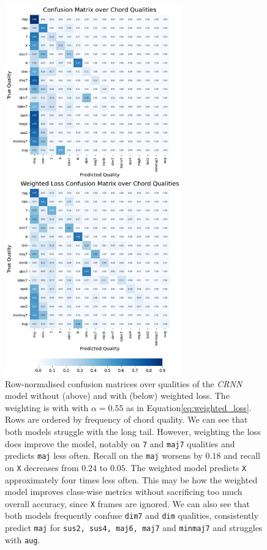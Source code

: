 \begin{figure}[H]
    \centering
    \includegraphics[width=0.68\textwidth]{figures/confusion_matrix_qualities.png}
    \caption{Row-normalised confusion matrices over qualities of the \emph{CRNN} model without (above) and with (below) weighted loss. The weighting is with with $\alpha = 0.55$ as in Equation\ref{eq:weighted_loss}. Rows are ordered by frequency of chord quality. We can see that both models struggle with the long tail. However, weighting the loss does improve the model, notably on \texttt{7} and \texttt{maj7} qualities and predicts \texttt{maj} less often. Recall on the \texttt{maj} worsens by $0.18$ and recall on \texttt{X} decreases from $0.24$ to $0.05$. The weighted model predicts \texttt{X} approximately four times less often. This may be how the weighted model improves class-wise metrics without sacrificing too much overall accuracy, since \texttt{X} frames are ignored. We can also see that both models frequently confuse \texttt{dim7} and \texttt{dim} qualities, consistently predict \texttt{maj} for \texttt{sus2, sus4, maj6, maj7} and \texttt{minmaj7} and struggles with \texttt{aug}.}\label{fig:crnn_qual_cm}
\end{figure}

